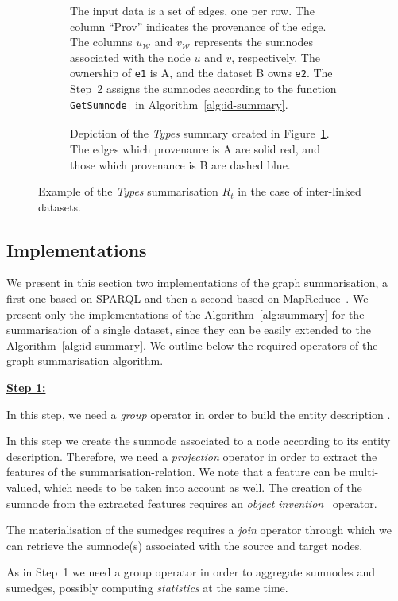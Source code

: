 \begin{figure}
	\centering
	\begin{subfigure}{\textwidth}
		\centering
		\resizebox{\textwidth}{!}{
			
		}
		\caption{The input data is a set of edges, one per row. The column ``Prov'' indicates the provenance of the edge. The columns $u_\mathcal{W}$ and $v_\mathcal{W}$ represents the sumnodes associated with the node $u$ and $v$, respectively. The ownership of \texttt{e1} is A, and the dataset B owns \texttt{e2}. The Step~2 assigns the sumnodes according to the function \texttt{GetSumnode\textsubscript{i}} in Algorithm~\ref{alg:id-summary}.}
		\label{tab:id-algo-ex}
	\end{subfigure}
	\quad
	\begin{subfigure}{.8\textwidth}
		\centering
		\resizebox{.8\textwidth}{!}{
			
		}
		\caption{Depiction of the \emph{Types} summary created in Figure~\ref{tab:id-algo-ex}. The edges which provenance is A are solid red, and those which provenance is B are dashed blue.}
		\label{fig:id-algo-ex}
	\end{subfigure}
	\caption{Example of the \emph{Types} summarisation $R_t$ in the case of inter-linked datasets.}
\end{figure}

\subsection{Implementations}
\label{sec:summary-impl}

We present in this section two implementations of the graph summarisation, a first one based on SPARQL and then a second based on MapReduce~\cite{dean:2004:msd}. We present only the implementations of the Algorithm~\ref{alg:summary} for the summarisation of a single dataset, since they can be easily extended to the Algorithm~\ref{alg:id-summary}. We outline below the required operators of the graph summarisation algorithm.
\begin{labeling}{\textbf{\underline{Step 1:}}}
\item[\textbf{\underline{Step 1:}}] In this step, we need a \emph{group} operator in order to build the entity description .
\item[\textbf{\underline{Step 2:}}] In this step we create the sumnode associated to a node according to its entity description. Therefore, we need a \emph{projection} operator in order to extract the features of the \gls{summarisation-relation}. We note that a feature can be multi-valued, which needs to be taken into account as well. The creation of the sumnode from the extracted features requires an \emph{object invention}~\cite{hull:1989:usi} operator.
\item[\textbf{\underline{Step 3:}}] The materialisation of the sumedges requires a \emph{join} operator through which we can retrieve the sumnode(s) associated with the source and target nodes.
\item[\textbf{\underline{Step 4:}}] As in Step~1 we need a group operator in order to aggregate sumnodes and sumedges, possibly computing \emph{statistics} at the same time.
\end{labeling}

